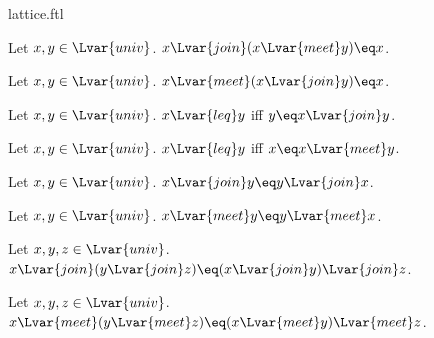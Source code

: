 \documentclass{naproche-library}
\begin{document}
\begin{smodule}{lattice.ftl}
\begin{proposition*}[forthel,id=JoinAbsorbsMeetThm,printid]
  Let $x,y\in\Lvar{univ}$.
  $x{\Lvar{join}}(x{\Lvar{meet}}y)\eq x$.
\end{proposition*}

\begin{proposition*}[forthel,id=MeetAbsorbsJoinThm,printid]
  Let $x,y\in\Lvar{univ}$.
  $x{\Lvar{meet}}(x{\Lvar{join}}y)\eq x$.
\end{proposition*}

\begin{proposition*}[forthel,id=PrecedingIffJoinEqualsLargerOperandThm,printid]
  Let $x,y\in\Lvar{univ}$.
  $x{\Lvar{leq}}y$ iff $y\eq x{\Lvar{join}}y$.
\end{proposition*}

\begin{proposition*}[forthel,id=PrecedingIffMeetEqualsLargerOperandThm,printid]
  Let $x,y\in\Lvar{univ}$.
  $x{\Lvar{leq}}y$ iff $x\eq x{\Lvar{meet}}y$.
\end{proposition*}

\begin{proposition*}[forthel,id=JoinIsCommutativeThm,printid]
  Let $x,y\in\Lvar{univ}$.
  $x{\Lvar{join}}y\eq y{\Lvar{join}}x$.
\end{proposition*}

\begin{proposition*}[forthel,id=MeetIsCommutativeThm,printid]
  Let $x,y\in\Lvar{univ}$.
  $x{\Lvar{meet}}y\eq y{\Lvar{meet}}x$.
\end{proposition*}

\begin{proposition*}[forthel,id=JoinIsAssociativeThm,printid]
  Let $x,y,z\in\Lvar{univ}$.
  $x{\Lvar{join}}(y{\Lvar{join}}z)\eq (x{\Lvar{join}}y){\Lvar{join}}z$.
\end{proposition*}

\begin{proposition*}[forthel,id=MeetIsAssociativeThm,printid]
  Let $x,y,z\in\Lvar{univ}$.
  $x{\Lvar{meet}}(y{\Lvar{meet}}z)\eq (x{\Lvar{meet}}y){\Lvar{meet}}z$.
\end{proposition*}
\end{smodule}
\end{document}
